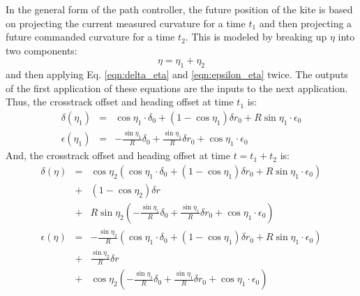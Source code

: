 \documentclass{article} %
\begin{document}
In the general form of the path controller, the future position of the
kite is based on projecting the current measured curvature for a time
$t_1$ and then projecting a future commanded curvature for a time
$t_2$.  This is modeled by breaking up $\eta$ into two components:
%
\begin{equation}
\eta = \eta_1 + \eta_2
\end{equation}
%
and then applying Eq. \ref{eqn:delta_eta} and \ref{eqn:epsilon_eta}
twice.  The outputs of the first application of these equations are
the inputs to the next application.  Thus, the crosstrack offset and
heading offset at time $t_1$ is:
%
\begin{eqnarray}
\delta(\eta_1) &=& \cos \eta_1 \cdot \delta_0 + (1 - \cos \eta_1) \delta r_0 +
R \sin \eta_1 \cdot \epsilon_0 \\
\epsilon(\eta_1) &=& -\frac{\sin \eta_1}{R} \delta_0 +
\frac{\sin \eta_1}{R} \delta r_0 +
\cos \eta_1 \cdot \epsilon_0
\end{eqnarray}
%
And, the crosstrack offset and heading offset at time $t = t_1 + t_2$
is:
%
\begin{eqnarray}
\delta(\eta) &=& \cos \eta_2 \left(
\cos \eta_1 \cdot \delta_0 + (1 - \cos \eta_1) \delta r_0 +
R \sin \eta_1 \cdot \epsilon_0 \right) \\
&+& (1 - \cos \eta_2) \delta r \nonumber \\
&+& R \sin \eta_2 \left(-\frac{\sin \eta_1}{R} \delta_0 +
\frac{\sin \eta_1}{R} \delta r_0 +
\cos \eta_1 \cdot \epsilon_0 \right) \nonumber \\
\epsilon(\eta) &=& -\frac{\sin \eta_2}{R} \left(
\cos \eta_1 \cdot \delta_0 + (1 - \cos \eta_1) \delta r_0 +
R \sin \eta_1 \cdot \epsilon_0 \right) \\
&+& \frac{\sin \eta_2}{R} \delta r \nonumber \\
&+& \cos \eta_2 \left(-\frac{\sin \eta_1}{R} \delta_0 +
\frac{\sin \eta_1}{R} \delta r_0 +
\cos \eta_1 \cdot \epsilon_0 \right) \nonumber
\end{eqnarray}
\end{document}
